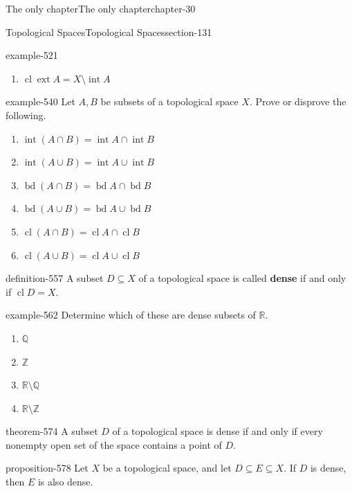 \documentclass[oneside,10pt,]{book}
\newcommand{\terminology}[1]{\textbf{#1}}
\newcommand{\mb}{\mathbb}
\newcommand{\cl}{\operatorname{cl}}
\renewcommand{\int}{\operatorname{int}}
\newcommand{\ext}{\operatorname{ext}}
\newcommand{\bd}{\operatorname{bd}}
\begin{document}
\begin{chapterptx}{The only chapter}{}{The only chapter}{}{}{chapter-30}
\begin{sectionptx}{Topological Spaces}{}{Topological Spaces}{}{}{section-131}
\begin{example}{}{example-521}
\begin{enumerate}
\item\hypertarget{li-538}{}\(\cl\ext A=X\setminus\int A\)%
\end{enumerate}
\end{example}
\begin{example}{}{example-540}%
\hypertarget{p-541}{}%
Let \(A,B\) be subsets of a topological space \(X\). Prove or disprove the following.%
\leavevmode%
\begin{enumerate}
\item\hypertarget{li-545}{}\(\int(A\cap B)=\int A\cap\int B\)%
\item\hypertarget{li-547}{}\(\int(A\cup B)=\int A\cup\int B\)%
\item\hypertarget{li-549}{}\(\bd(A\cap B)=\bd A\cap\bd B\)%
\item\hypertarget{li-551}{}\(\bd(A\cup B)=\bd A\cup\bd B\)%
\item\hypertarget{li-553}{}\(\cl(A\cap B)=\cl A\cap\cl B\)%
\item\hypertarget{li-555}{}\(\cl(A\cup B)=\cl A\cup\cl B\)%
\end{enumerate}
\end{example}
\begin{definition}{}{definition-557}%
\hypertarget{p-558}{}%
A subset \(D\subseteq X\) of a topological space is called \terminology{dense} if and only if \(\cl D=X\).%
\end{definition}
\begin{example}{}{example-562}%
\hypertarget{p-563}{}%
Determine which of these are dense subsets of \(\mb R\).%
\leavevmode%
\begin{enumerate}
\item\hypertarget{li-566}{}\(\mb Q\)%
\item\hypertarget{li-568}{}\(\mb Z\)%
\item\hypertarget{li-570}{}\(\mb R\setminus\mb Q\)%
\item\hypertarget{li-572}{}\(\mb R\setminus\mb Z\)%
\end{enumerate}
\end{example}
\begin{theorem}{}{}{theorem-574}%
\hypertarget{p-575}{}%
A subset \(D\) of a topological space is dense if and only if every nonempty open set of the space contains a point of \(D\).%
\end{theorem}
\begin{proposition}{}{}{proposition-578}%
\hypertarget{p-579}{}%
Let \(X\) be a topological space, and let \(D\subseteq E\subseteq X\). If \(D\) is dense, then \(E\) is also dense.%

\end{proposition}
\end{sectionptx}
\end{chapterptx}
\end{document}
